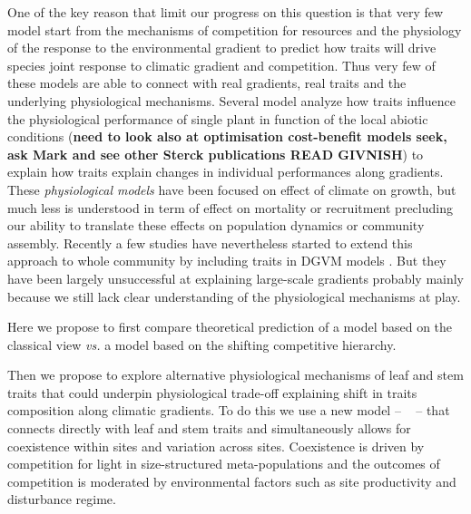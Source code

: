 \documentclass[a4paper,11pt]{article}
\begin{document}
One of the key reason that limit our progress on this question is that very few model start from the mechanisms of competition for resources and the physiology of the response to the environmental gradient to predict how traits will drive species joint response to climatic gradient and competition. Thus very few of these models are able to connect with real gradients,
real traits and the underlying physiological mechanisms. Several model
analyze how traits influence the physiological performance of single
plant in function of the local abiotic conditions \citep{Sterck-2011}
(\textbf{need to look also at optimisation cost-benefit models seek, ask Mark
and see other Sterck publications READ GIVNISH}) to explain how traits explain changes in individual performances along gradients. These \textit{physiological models} have been focused on effect of climate on growth, but much less is understood in term of effect on mortality or recruitment precluding our ability to translate these effects on population dynamics or community assembly. Recently a few studies have nevertheless started to extend this approach to whole community by including traits in DGVM models \citep[see][]{Sakschewski-2015,Scheiter-2013}. But they have been largely unsuccessful at explaining large-scale gradients probably mainly because we still lack clear understanding of the physiological mechanisms at play.

Here we propose to first compare theoretical prediction of a model based on the classical view \textit{vs.} a model based on the shifting competitive hierarchy.

Then we propose to explore alternative physiological mechanisms of leaf and stem traits that could underpin physiological trade-off explaining shift in traits composition along climatic gradients. To do this we use a new model -- \plant\ \citep{Falster-2016,Falster-2017} -- that connects directly with leaf and stem traits and simultaneously allows for coexistence within sites and variation across sites.  Coexistence is driven by competition for light in size-structured meta-populations and the outcomes of competition is moderated by environmental factors such as site productivity and disturbance regime.
\end{document}
